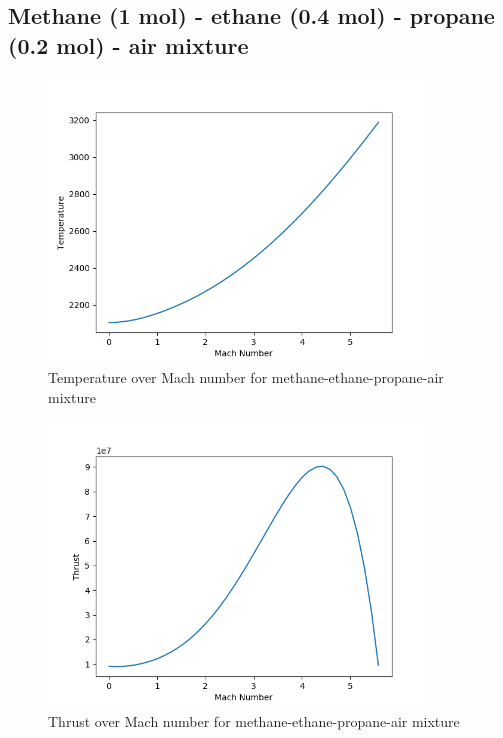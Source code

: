 \documentclass[a4paper,11pt]{article}
\begin{document}
\subsection{Methane (1 mol) - ethane (0.4 mol) - propane (0.2 mol) - air mixture}
	\begin{figure}[H]
		\centering
       		\includegraphics[width=0.9\textwidth]{Metan(1mol)_etan(0.4mol)_propan(0.2mol)_pow/Temperature_over_Mach.png}
       		\caption{Temperature over Mach number for methane-ethane-propane-air mixture}
	\end{figure}
	\begin{figure}[H]
		\centering
		\includegraphics[width=0.9\textwidth]{Metan(1mol)_etan(0.4mol)_propan(0.2mol)_pow/Thrust_over_Mach.png}
       		\caption{Thrust over Mach number for methane-ethane-propane-air mixture}
	\end{figure}
\end{document}
